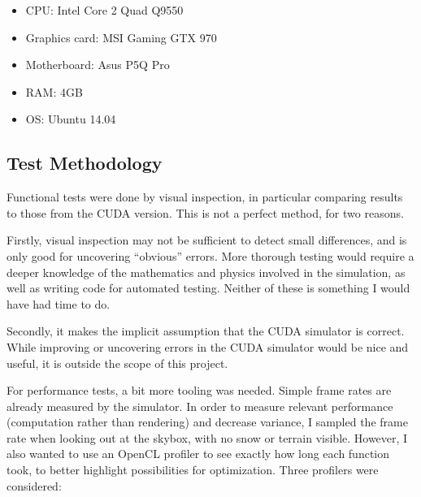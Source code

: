 \begin{itemize}
\item CPU: Intel Core 2 Quad Q9550
\item Graphics card: MSI Gaming GTX 970
\item Motherboard: Asus P5Q Pro
\item RAM: 4GB
\item OS: Ubuntu 14.04
\end{itemize}

\subsection{Test Methodology}
Functional tests were done by visual inspection, in particular comparing results to those from the CUDA version. This is not a perfect method, for two reasons. 

Firstly, visual inspection may not be sufficient to detect small differences, and is only good for uncovering “obvious” errors. More thorough testing would require a deeper knowledge of the mathematics and physics involved in the simulation, as well as writing code for automated testing. Neither of these is something I would have had time to do. 

Secondly, it makes the implicit assumption that the CUDA simulator is correct. While improving or uncovering errors in the CUDA simulator would be nice and useful, it is outside the scope of this project.

For performance tests, a bit more tooling was needed. Simple frame rates are already measured by the simulator. In order to measure relevant performance (computation rather than rendering) and decrease variance, I sampled the frame rate when looking out at the skybox, with no snow or terrain visible. However, I also wanted to use an OpenCL profiler to see exactly how long each function took, to better highlight possibilities for optimization. Three profilers were considered:

